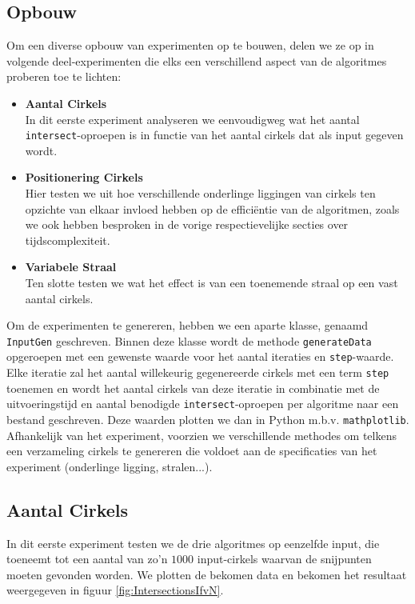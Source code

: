 \documentclass[12pt]{article}
\begin{document}
\subsection{Opbouw}
Om een diverse opbouw van experimenten op te bouwen, delen we ze op in volgende deel-experimenten die elks een verschillend aspect van de algoritmes proberen toe te lichten:
\begin{itemize}
	\item \textbf{Aantal Cirkels}\\
	In dit eerste experiment analyseren we eenvoudigweg wat het aantal \texttt{intersect}-oproepen is in functie van het aantal cirkels dat als input gegeven wordt. 
	\item \textbf{Positionering Cirkels}\\
	Hier testen we uit hoe verschillende onderlinge liggingen van cirkels ten opzichte van elkaar invloed hebben op de efficiëntie van de algoritmen, zoals we ook hebben besproken in de vorige respectievelijke secties over tijdscomplexiteit.
	\item \textbf{Variabele Straal}\\
	Ten slotte testen we wat het effect is van een toenemende straal op een vast aantal cirkels.
\end{itemize}

Om de experimenten te genereren, hebben we een aparte klasse, genaamd \texttt{InputGen} geschreven. Binnen deze klasse wordt de methode \texttt{generateData} opgeroepen met een gewenste waarde voor het aantal iteraties en \texttt{step}-waarde. Elke iteratie zal het aantal willekeurig gegenereerde cirkels met een term \texttt{step} toenemen en wordt het aantal cirkels van deze iteratie in combinatie met de uitvoeringstijd en aantal benodigde \texttt{intersect}-oproepen per algoritme naar een bestand geschreven. Deze waarden plotten we dan in Python m.b.v. \texttt{mathplotlib}. Afhankelijk van het experiment, voorzien we verschillende methodes om telkens een verzameling cirkels te genereren die voldoet aan de specificaties van het experiment (onderlinge ligging, stralen...).

\subsection{Aantal Cirkels}\label{sec:aantalCirkels}
In dit eerste experiment testen we de drie algoritmes op eenzelfde input, die toeneemt tot een aantal van zo'n $1000$ input-cirkels waarvan de snijpunten moeten gevonden worden. We plotten de bekomen data en bekomen het resultaat weergegeven in figuur \ref{fig:IntersectionsIfvN}. 
\end{document}

